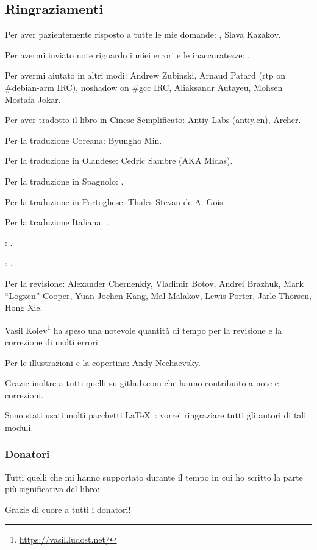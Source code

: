\subsection*{Ringraziamenti}

Per aver pazientemente risposto a tutte le mie domande: \HERMIT, Slava  Kazakov.

Per avermi inviato note riguardo i miei errori e le inaccuratezze: \PeopleMistakesInaccuracies{}.

Per avermi aiutato in altri modi:
Andrew Zubinski,
Arnaud Patard (rtp on \#debian-arm IRC),
noshadow on \#gcc IRC,
Aliaksandr Autayeu,
Mohsen Mostafa Jokar.

Per aver tradotto il libro in Cinese Semplificato:
Antiy Labs (\href{http://antiy.cn}{antiy.cn}), Archer.

Per la traduzione Coreana: Byungho Min.

Per la traduzione in Olandese: Cedric Sambre (AKA Midas).

Per la traduzione in Spagnolo: \PeopleSpanishTranslators{}.

Per la traduzione in Portoghese: Thales Stevan de A. Gois.

Per la traduzione Italiana: \PeopleItalianTranslators{}.

\ITAph{}: \PeopleFrenchTranslators{}.

\ITAph{}: \PeopleGermanTranslators{}.

Per la revisione:
Alexander  Chernenkiy,
Vladimir Botov,
Andrei Brazhuk,
Mark ``Logxen'' Cooper, Yuan Jochen Kang, Mal Malakov, Lewis Porter, Jarle Thorsen, Hong Xie.

Vasil Kolev\footnote{\url{https://vasil.ludost.net/}} ha speso una notevole quantità di tempo per la revisione e la correzione di molti errori.

Per le illustrazioni e la copertina: Andy Nechaevsky.

Grazie inoltre a tutti quelli su github.com che hanno contribuito a note e correzioni\FNGithubContributors{}.

Sono stati usati molti pacchetti \LaTeX\ : vorrei ringraziare tutti gli autori di tali moduli.

\subsubsection*{Donatori}

Tutti quelli che mi hanno supportato durante il tempo in cui ho scritto la parte più significativa del libro:



Grazie di cuore a tutti i donatori!

